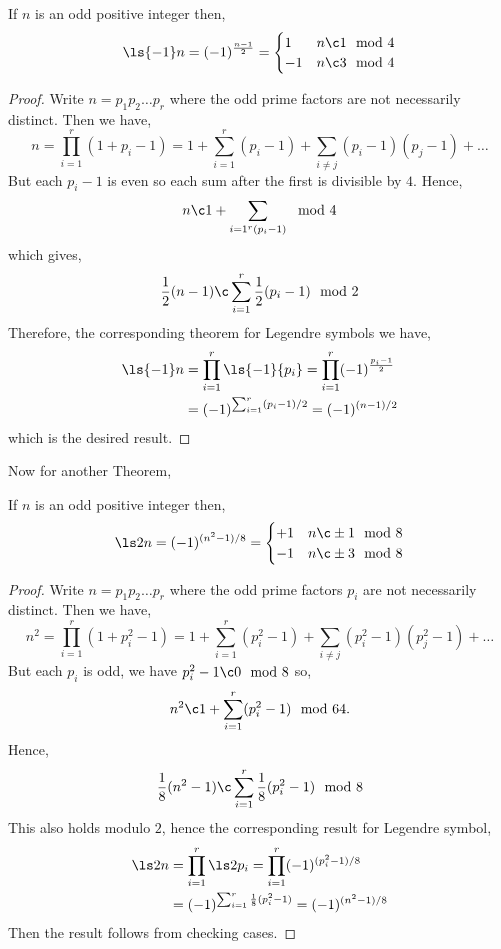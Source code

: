 \begin{nthm}[]
  If $n$ is an odd positive integer then,
  $$ \ls {-1} n = (-1)^{\frac{n-1}{2}} = \begin{cases}
    1 & n\c 1 \mod 4 \\
    -1 & n\c 3 \mod 4
  \end{cases} $$
\end{nthm}
\begin{proof}
  Write $n = p_1p_2 \dots p_r$ where the odd prime factors are not necessarily distinct. Then we have,
  $$ n = \prod_{i=1}^r (1 + p_i - 1) = 1 + \sum_{i=1}^r (p_i - 1) + \sum_{i \ne j}(p_i - 1)(p_j - 1) + \dots $$
  But each $p_i - 1$ is even so each sum after the first is divisible by $4$. Hence,
  $$ n \c 1 + \sum_{i=1^r (p_i - 1)}\mod 4 $$
  which gives,
  $$ \frac{1}{2}(n - 1) \c \sum_{i=1}^r \frac{1}{2}(p_i - 1) \mod 2 $$
  Therefore, the corresponding theorem for Legendre symbols we have,
  \begin{align*}
    \ls {-1} n &= \prod_{i=1}^r \ls {-1} {p_i} = \prod_{i=1}^r (-1)^{\frac{p_i - 1}{2}}\\
    &= (-1)^{\sum_{i=1}^r (p_i - 1)/2} = (-1)^{(n-1)/2}
  \end{align*}
  which is the desired result.
\end{proof}

\noindent
Now for another Theorem,
\begin{nthm}
  If $n$ is an odd positive integer then,
  $$ \ls 2 n = (-1)^{(n^2 - 1)/8} = \begin{cases}
    +1 & n \c \pm 1 \mod 8 \\
    -1 & n \c \pm 3 \mod 8
  \end{cases} $$
\end{nthm}
\begin{proof}
  Write $n = p_1p_2 \dots p_r$ where the odd prime factors $p_i$ are not necessarily distinct. Then we have,
  $$ n^2 = \prod_{i=1}^r (1 + p_i^2 - 1) = 1 + \sum_{i=1}^r (p_i^2 - 1) + \sum_{i \ne j} (p_i^2 - 1)(p_j^2 - 1) + \dots $$
  But each $p_i$ is odd, we have $p_i^2 - 1 \c 0 \mod 8$ so,
  $$ n^2 \c 1 + \sum_{i=1}^r (p_i^2 - 1)\mod 64. $$
  Hence,
  $$ \frac{1}{8}(n^2 - 1) \c \sum_{i=1}^r \frac{1}{8}(p_i^2 - 1) \mod 8 $$
  This also holds modulo $2$, hence the corresponding result for Legendre symbol,
  \begin{align*}
    \ls 2 n &= \prod_{i=1}^r \ls 2 {p_i} = \prod_{i=1}^r (-1)^{(p_i^2 - 1)/8}\\
    &= (-1)^{\sum_{i=1}^r \frac{1}{8}(p_i^2 - 1)} = (-1)^{(n^2 - 1)/ 8}
  \end{align*}
  Then the result follows from checking cases.
\end{proof}

